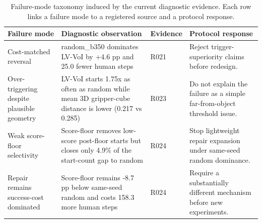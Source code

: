 \begin{table}[t]
\centering
\caption{Failure-mode taxonomy induced by the current diagnostic evidence. Each row links a failure mode to a registered source and a protocol response.}
\label{tab:failure_taxonomy_r056}
\begin{tabular}{p{}p{}p{}p{}}
\toprule
Failure mode & Diagnostic observation & Evidence & Protocol response \\
\midrule
Cost-matched reversal & random\_b350 dominates LV-VoI by +4.6 pp and 25.0 fewer human steps & R021 & Reject trigger-superiority claims before redesign. \\
Over-triggering despite plausible geometry & LV-VoI starts 1.75x as often as random while mean 3D gripper-cube distance is lower (0.217 vs 0.285) & R023 & Do not explain the failure as a simple far-from-object threshold issue. \\
Weak score-floor selectivity & Score-floor removes low-score post-floor starts but closes only 4.9\% of the start-count gap to random & R024 & Stop lightweight repair expansion under same-seed random dominance. \\
Repair remains success-cost dominated & Score-floor remains -8.7 pp below same-seed random and costs 158.3 more human steps & R024 & Require a substantially different mechanism before new experiments. \\
\bottomrule
\end{tabular}
\end{table}
